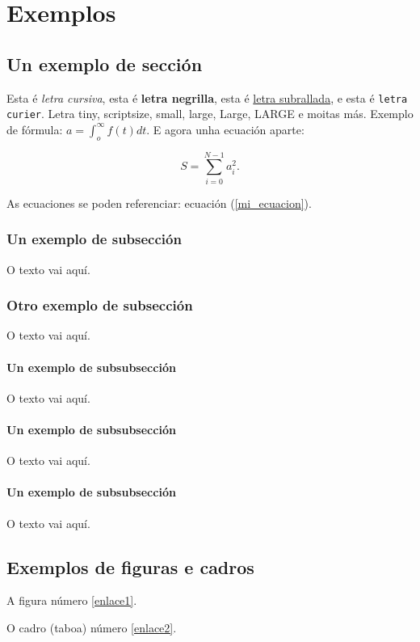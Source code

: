 \chapter{Exemplos}

\section{Un exemplo de sección}
Esta é {\it letra cursiva}, esta é {\bf letra negrilla}, esta é \underline{letra subrallada}, e esta é {\tt letra curier}. Letra {\tiny tiny}, {\scriptsize scriptsize}, {\small small}, {\large large}, {\Large Large}, {\LARGE LARGE} e moitas más. Exemplo de fórmula: $a=\int_o^\infty f(t)dt$.  E agora unha ecuación aparte:

\begin{equation}
S=\sum_{i=0}^{N-1} a_i^2 .
\label{mi_ecuacion}
\end{equation}

As ecuaciones se poden referenciar: ecuación (\ref{mi_ecuacion}).

\subsection{Un exemplo de subsección}
O texto vai aquí.
\subsection{Otro exemplo de subsección}
O texto vai aquí.
\subsubsection{Un exemplo de subsubsección}
O texto vai aquí.
\subsubsection{Un exemplo de subsubsección}
O texto vai aquí.
\subsubsection{Un exemplo de subsubsección}
O texto vai aquí.
\section{Exemplos de figuras e cadros}

A figura número \ref{enlace1}.

O cadro (taboa) número \ref{enlace2}.

